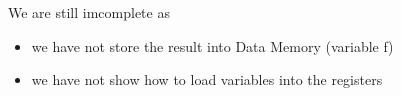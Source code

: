 \documentclass[letterpaper, 12pt]{article}
\begin{document}
    \bigskip
    We are still imcomplete as
    \begin{itemize}
        \item we have not store the result into Data Memory (variable f)
        \item we have not show how to load variables into the registers
    \end{itemize}

    \bigskip
    
\end{document}
